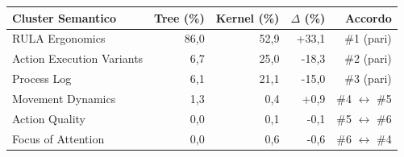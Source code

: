 \begin{tabular*}{\linewidth}{@{}l@{\extracolsep{\fill}}rrrr@{}}
\toprule
\textbf{Cluster Semantico} & \textbf{Tree (\%)} & \textbf{Kernel (\%)} & \textbf{$\Delta$ (\%)} & \textbf{Accordo} \\
\midrule
RULA Ergonomics & 86{,}0 & 52{,}9 & +33{,}1 & \#1 (pari) \\
Action Execution Variants & 6{,}7 & 25{,}0 & -18{,}3 & \#2 (pari) \\
Process Log & 6{,}1 & 21{,}1 & -15{,}0 & \#3 (pari) \\
Movement Dynamics & 1{,}3 & 0{,}4 & +0{,}9 & \#4 $\leftrightarrow$ \#5 \\
Action Quality & 0{,}0 & 0{,}1 & -0{,}1 & \#5 $\leftrightarrow$ \#6 \\
Focus of Attention & 0{,}0 & 0{,}6 & -0{,}6 & \#6 $\leftrightarrow$ \#4 \\
\bottomrule
\end{tabular*}
